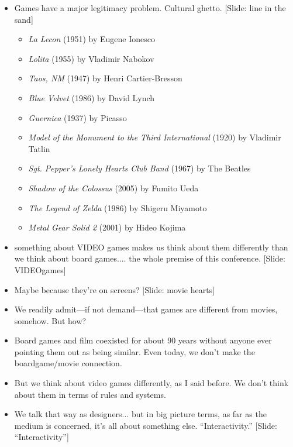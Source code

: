 \documentclass[12pt]{article}
\begin{document}
{\Huge

\begin{itemize}

\item Games have a major legitimacy problem.  Cultural ghetto.  [Slide:  line in the sand] {\large \begin{itemize}
\item {\it La Lecon} (1951) by Eugene Ionesco
\item {\it Lolita} (1955) by Vladimir Nabokov
\item {\it Taos, NM} (1947) by Henri Cartier-Bresson
\item {\it Blue Velvet} (1986) by David Lynch
\item {\it Guernica} (1937) by Picasso
\item {\it Model of the Monument to the Third International} (1920) by Vladimir Tatlin
\item {\it Sgt. Pepper's Lonely Hearts Club Band} (1967) by The Beatles
\item {\it Shadow of the Colossus} (2005) by Fumito Ueda
\item {\it The Legend of Zelda} (1986) by Shigeru Miyamoto
\item {\it Metal Gear Solid 2} (2001) by Hideo Kojima 
\end{itemize} }



\item something about VIDEO games makes us think about them differently than we think about board games.... the whole premise of this conference.  [Slide: VIDEOgames]

\item Maybe because they're on screens? [Slide: movie hearts]


\item We readily admit---if not demand---that games are different from movies, somehow.  But how?  

\item Board games and film coexisted for about 90 years without anyone ever pointing them out as being similar.  Even today, we don't make the boardgame/movie connection.  

\item But we think about video games differently, as I said before.  We don't think about them in terms of rules and systems.  

\item We talk that way as designers... but in big picture terms, as far as the medium is concerned, it's all about something else. ``Interactivity.''  [Slide: ``Interactivity'']


\end{itemize}}
\end{document}
